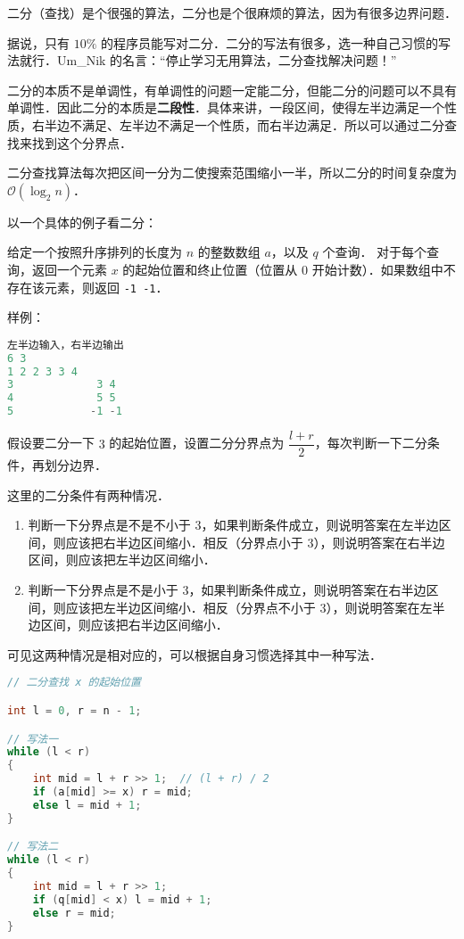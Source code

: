 
二分（查找）是个很强的算法，二分也是个很麻烦的算法，因为有很多边界问题．

据说，只有 $10 \%$ 的程序员能写对二分．二分的写法有很多，选一种自己习惯的写法就行．Um_Nik 的名言：“停止学习无用算法，二分查找解决问题！”

二分的本质不是单调性，有单调性的问题一定能二分，但能二分的问题可以不具有单调性．因此二分的本质是\textbf{二段性}．具体来讲，一段区间，使得左半边满足一个性质，右半边不满足、左半边不满足一个性质，而右半边满足．所以可以通过二分查找来找到这个分界点．

二分查找算法每次把区间一分为二使搜索范围缩小一半，所以二分的时间复杂度为 $\mathcal{O}(\log_2 n)$．

以一个具体的例子看二分：

给定一个按照升序排列的长度为 $n$ 的整数数组 $a$，以及 $q$ 个查询．
对于每个查询，返回一个元素 $x$ 的起始位置和终止位置（位置从 $0$ 开始计数）．如果数组中不存在该元素，则返回 \verb|-1 -1|．

样例：
\begin{lstlisting}[language=cpp]
左半边输入，右半边输出
6 3
1 2 2 3 3 4
3             3 4
4             5 5
5            -1 -1
\end{lstlisting}

假设要二分一下 $3$ 的起始位置，设置二分分界点为 $\dfrac{l+r}{2}$，每次判断一下二分条件，再划分边界．

这里的二分条件有两种情况．

\begin{enumerate}
\item 判断一下分界点是不是不小于 $3$，如果判断条件成立，则说明答案在左半边区间，则应该把右半边区间缩小．相反（分界点小于 $3$），则说明答案在右半边区间，则应该把左半边区间缩小．
\item 判断一下分界点是不是小于 $3$，如果判断条件成立，则说明答案在右半边区间，则应该把左半边区间缩小．相反（分界点不小于 $3$），则说明答案在左半边区间，则应该把右半边区间缩小．
\end{enumerate}
可见这两种情况是相对应的，可以根据自身习惯选择其中一种写法．

\begin{lstlisting}[language=cpp]
// 二分查找 x 的起始位置

int l = 0, r = n - 1;

// 写法一
while (l < r)
{
	int mid = l + r >> 1;  // (l + r) / 2
    if (a[mid] >= x) r = mid;
    else l = mid + 1;
}

// 写法二
while (l < r)
{
    int mid = l + r >> 1;
    if (q[mid] < x) l = mid + 1;
    else r = mid;
}
\end{lstlisting}

